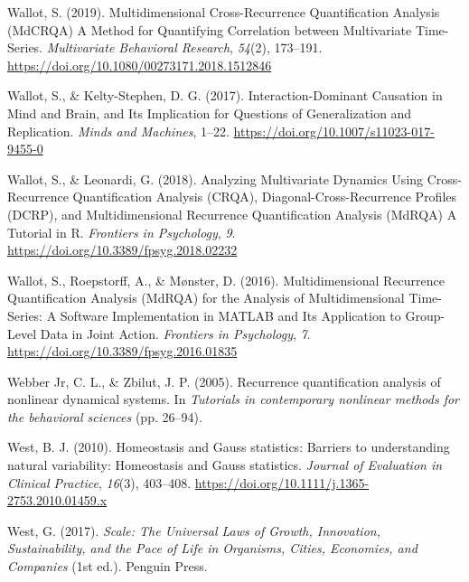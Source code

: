 \documentclass[
  british,
  man,floatsintext]{apa6}
\begin{document}
\leavevmode\hypertarget{ref-wallotMultidimensionalCrossRecurrenceQuantification2019}{}%
Wallot, S. (2019). Multidimensional Cross-Recurrence Quantification Analysis (MdCRQA) A Method for Quantifying Correlation between Multivariate Time-Series. \emph{Multivariate Behavioral Research}, \emph{54}(2), 173--191. \url{https://doi.org/10.1080/00273171.2018.1512846}

\leavevmode\hypertarget{ref-wallotInteractionDominantCausationMind2017}{}%
Wallot, S., \& Kelty-Stephen, D. G. (2017). Interaction-Dominant Causation in Mind and Brain, and Its Implication for Questions of Generalization and Replication. \emph{Minds and Machines}, 1--22. \url{https://doi.org/10.1007/s11023-017-9455-0}

\leavevmode\hypertarget{ref-wallotAnalyzingMultivariateDynamics2018}{}%
Wallot, S., \& Leonardi, G. (2018). Analyzing Multivariate Dynamics Using Cross-Recurrence Quantification Analysis (CRQA), Diagonal-Cross-Recurrence Profiles (DCRP), and Multidimensional Recurrence Quantification Analysis (MdRQA) A Tutorial in R. \emph{Frontiers in Psychology}, \emph{9}. \url{https://doi.org/10.3389/fpsyg.2018.02232}

\leavevmode\hypertarget{ref-wallotMultidimensionalRecurrenceQuantification2016}{}%
Wallot, S., Roepstorff, A., \& Mønster, D. (2016). Multidimensional Recurrence Quantification Analysis (MdRQA) for the Analysis of Multidimensional Time-Series: A Software Implementation in MATLAB and Its Application to Group-Level Data in Joint Action. \emph{Frontiers in Psychology}, \emph{7}. \url{https://doi.org/10.3389/fpsyg.2016.01835}

\leavevmode\hypertarget{ref-webberjrRecurrenceQuantificationAnalysis2005}{}%
Webber Jr, C. L., \& Zbilut, J. P. (2005). Recurrence quantification analysis of nonlinear dynamical systems. In \emph{Tutorials in contemporary nonlinear methods for the behavioral sciences} (pp. 26--94).

\leavevmode\hypertarget{ref-westHomeostasisGaussStatistics2010}{}%
West, B. J. (2010). Homeostasis and Gauss statistics: Barriers to understanding natural variability: Homeostasis and Gauss statistics. \emph{Journal of Evaluation in Clinical Practice}, \emph{16}(3), 403--408. \url{https://doi.org/10.1111/j.1365-2753.2010.01459.x}

\leavevmode\hypertarget{ref-westScaleUniversalLaws2017}{}%
West, G. (2017). \emph{Scale: The Universal Laws of Growth, Innovation, Sustainability, and the Pace of Life in Organisms, Cities, Economies, and Companies} (1st ed.). Penguin Press.
\end{document}
